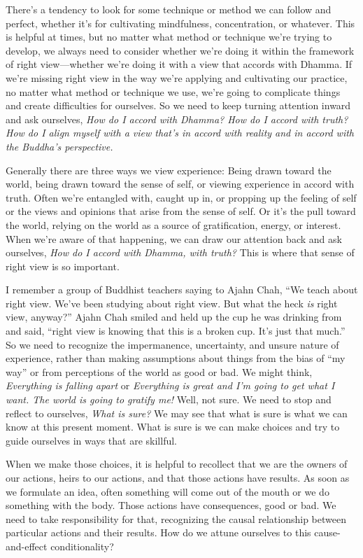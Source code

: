There's a tendency to look for some technique or method we can follow 
and perfect, whether it's for cultivating mindfulness, concentration, 
or whatever. This is helpful at times, but no matter what method or 
technique we're trying to develop, we always need to consider whether 
we're doing it within the framework of right view---whether we're doing 
it with a view that accords with Dhamma. If we're missing right view in 
the way we're applying and cultivating our practice, no matter what 
method or technique we use, we're going to complicate things and create 
difficulties for ourselves. So we need to keep turning attention inward 
and ask ourselves, \emph{How do I accord with Dhamma? How do I accord 
with truth? How do I align myself with a view that's in accord with 
reality and in accord with the Buddha's perspective.}

Generally there are three ways we view experience: Being drawn toward 
the world, being drawn toward the sense of self, or viewing experience 
in accord with truth. Often we're entangled with, caught up in, or 
propping up the feeling of self or the views and opinions that arise 
from the sense of self. Or it's the pull toward the world, relying on 
the world as a source of gratification, energy, or interest. When we're 
aware of that happening, we can draw our attention back and ask 
ourselves, \emph{How do I accord with Dhamma, with truth?} This is 
where that sense of right view is so important.

I remember a group of Buddhist teachers saying to Ajahn Chah, ``We 
teach about right view. We've been studying about right view. But what 
the heck \emph{is} right view, anyway?'' Ajahn Chah smiled and held up 
the cup he was drinking from and said, ``right view is knowing that 
this is a broken cup. It's just that much.'' So we need to recognize 
the impermanence, uncertainty, and unsure nature of experience, rather 
than making assumptions about things from the bias of ``my way'' or 
from perceptions of the world as good or bad. We might think, 
\emph{Everything is falling apart} or \emph{Everything is great and I'm 
going to get what I want. The world is going to gratify me!} Well, not 
sure. We need to stop and reflect to ourselves, \emph{What is sure?} We 
may see that what is sure is what we can know at this present moment. 
What is sure is we can make choices and try to guide ourselves in ways 
that are skillful.

When we make those choices, it is helpful to recollect that we are the 
owners of our actions, heirs to our actions, and that those actions 
have results. As soon as we formulate an idea, often something will 
come out of the mouth or we do something with the body. Those actions 
have consequences, good or bad. We need to take responsibility for 
that, recognizing the causal relationship between particular actions 
and their results. How do we attune ourselves to this cause-and-effect 
conditionality?

